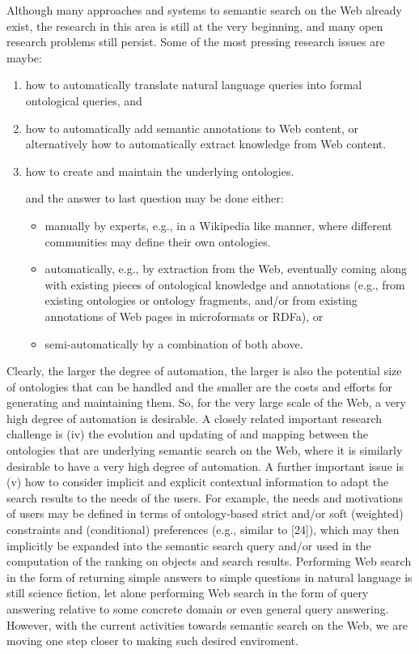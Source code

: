 \documentclass[12pt,a4]{article}
\begin{document}
Although many approaches and systems to semantic search on the Web already exist, the research in this area is still at the very beginning, and many open research problems still persist. Some of the most pressing research issues are maybe:
\begin{enumerate}
\item how to automatically translate natural language queries into formal ontological queries, and 
\item how to automatically add semantic annotations to Web content, or alternatively how to automatically extract knowledge from Web content. 
\item how to create and maintain the underlying ontologies. 

and the answer to last question may be done either:
\begin{itemize}
\item manually by experts, e.g., in a Wikipedia like manner, where different communities may define their own ontologies.
\item automatically, e.g., by extraction from the Web, eventually coming along with existing pieces of ontological knowledge and annotations (e.g., from existing ontologies or ontology fragments, and/or from existing annotations of Web pages in microformats or RDFa), or
\item semi-automatically by a combination of both above. 
\end{itemize}
\end{enumerate}
Clearly, the larger the degree of automation, the larger is also the potential size of ontologies that can be handled and the smaller are the costs and efforts for generating and maintaining them. So, for the very large scale of the Web, a very high degree of automation is desirable. A closely related important research challenge is (iv) the evolution and updating of and mapping between the ontologies that are underlying semantic search on the Web, where it is similarly desirable to have a very high degree of automation. A further important issue is (v) how to consider implicit and explicit contextual information to adapt the search results to the needs of the users. For example, the needs and motivations of users may be defined in terms of ontology-based strict and/or soft (weighted) constraints and (conditional) preferences (e.g., similar to [24]), which may then implicitly be expanded into the semantic search query and/or used in the computation of the ranking on objects and search results.
Performing Web search in the form of returning simple answers to simple questions in natural language is still science fiction, let alone performing Web search in the form of query answering relative to some concrete domain or even general query answering. However, with the current activities towards semantic search on the Web, we are moving one step closer to making such desired enviroment.
\end{document}
